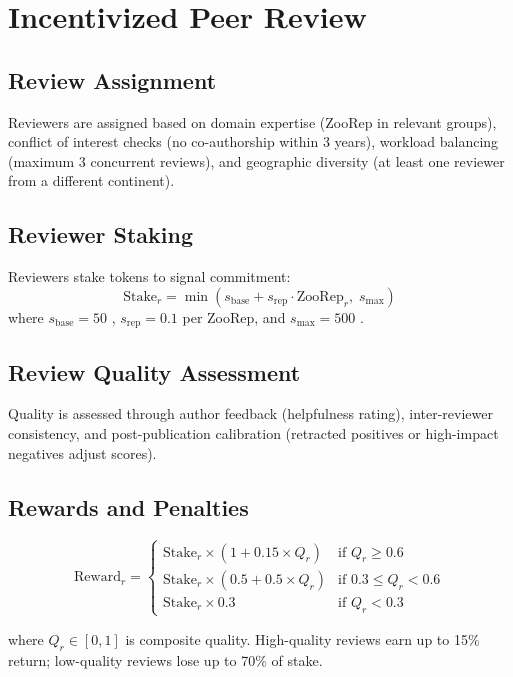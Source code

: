 \section{Incentivized Peer Review}

\label{sec:review}

\subsection{Review Assignment}

Reviewers are assigned based on domain expertise (ZooRep in relevant
groups), conflict of interest checks (no co-authorship within 3 years),
workload balancing (maximum 3 concurrent reviews), and geographic
diversity (at least one reviewer from a different continent).

\subsection{Reviewer Staking}

Reviewers stake \ZOO{} tokens to signal commitment:
\begin{equation}
  \text{Stake}_r = \min(s_{\text{base}} + s_{\text{rep}} \cdot
  \text{ZooRep}_r,\; s_{\max})
\end{equation}
where $s_{\text{base}} = 50$ \ZOO{}, $s_{\text{rep}} = 0.1$ \ZOO{} per
ZooRep, and $s_{\max} = 500$ \ZOO{}.

\subsection{Review Quality Assessment}

Quality is assessed through author feedback (helpfulness rating),
inter-reviewer consistency, and post-publication calibration (retracted
positives or high-impact negatives adjust scores).

\subsection{Rewards and Penalties}

\begin{equation}
  \text{Reward}_r = \begin{cases}
    \text{Stake}_r \times (1 + 0.15 \times Q_r) & \text{if } Q_r \geq 0.6 \\
    \text{Stake}_r \times (0.5 + 0.5 \times Q_r) & \text{if } 0.3 \leq Q_r < 0.6 \\
    \text{Stake}_r \times 0.3 & \text{if } Q_r < 0.3
  \end{cases}
\end{equation}

where $Q_r \in [0,1]$ is composite quality. High-quality reviews earn
up to 15\% return; low-quality reviews lose up to 70\% of stake.



